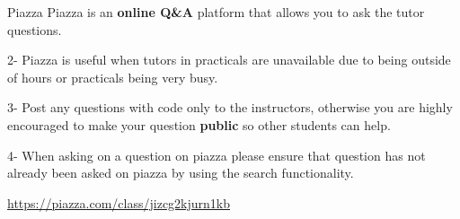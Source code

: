 \documentclass[week3]{csse1001}
\begin{document}
\begin{topic}{Piazza}
Piazza is an \textbf{online Q\&A} platform that allows you to ask the tutor questions.

\begin{subtopic}{2-}
Piazza is useful when tutors in practicals are unavailable due to being outside of hours or practicals being very busy.
\end{subtopic}

\begin{subtopic}{3-}
Post any questions with code only to the instructors, otherwise you are highly encouraged to make your question \textbf{public} so other students can help.
\end{subtopic}

\begin{subtopic}{4-}
When asking on a question on piazza please ensure that question has not already been asked on piazza by using the search functionality.
\end{subtopic}

\url{https://piazza.com/class/jizcg2kjurn1kb}
\end{topic}
\end{document}
